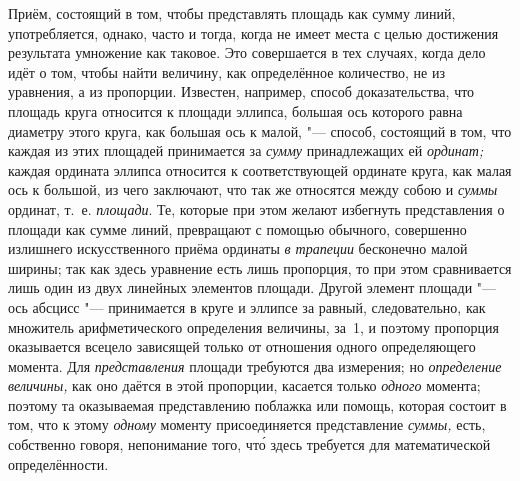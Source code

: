 Приём, состоящий в том, чтобы представлять площадь как сумму линий,
употребляется, однако, часто и тогда, когда не имеет места с целью достижения
результата умножение как таковое. Это совершается в тех случаях, когда дело
идёт о том, чтобы найти величину, как определённое количество, не из уравнения,
а из пропорции. Известен, например, способ доказательства, что площадь круга
относится к площади эллипса, большая ось которого равна диаметру этого круга,
как большая ось к малой, "--- способ, состоящий в том, что каждая из этих
площадей принимается за {\em сумму} принадлежащих ей {\em ординат;} каждая
ордината эллипса относится к соответствующей ординате круга, как малая ось
к большой, из чего заключают, что так же относятся между собою и {\em суммы}
ординат, т.~е. {\em площади}. Те, которые при этом желают избегнуть
представления о площади как сумме линий, превращают с помощью обычного,
совершенно излишнего искусственного приёма ординаты {\em в трапеции} бесконечно
малой ширины; так как здесь уравнение есть лишь пропорция, то при этом
сравнивается лишь один из двух линейных элементов площади. Другой элемент
площади "--- ось абсцисс "--- принимается в круге и эллипсе за равный,
следовательно, как множитель арифметического определения величины, за~1, и
поэтому пропорция оказывается всецело зависящей только от отношения одного
определяющего момента. Для {\em представления} площади требуются два измерения;
но {\em определение величины,} как оно даётся в этой пропорции, касается только
{\em одного} момента; поэтому та оказываемая представлению поблажка или помощь,
которая состоит в том, что к этому {\em одному} моменту присоединяется
представление {\em суммы,} есть, собственно говоря, непонимание того, чт\'{о} здесь
требуется для математической определённости.

